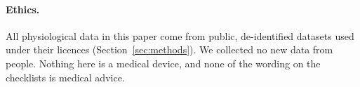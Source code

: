 \paragraph{Ethics.}
All physiological data in this paper come from public, de-identified datasets used under their licences (Section~\ref{sec:methods}). We collected no new data from people. Nothing here is a medical device, and none of the wording on the checklists is medical advice.
